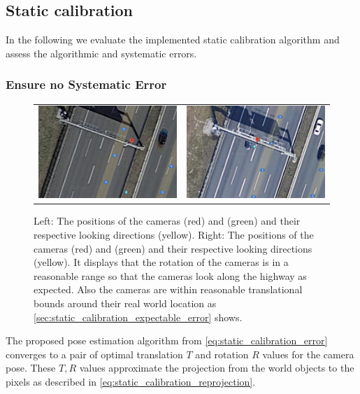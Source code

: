 
\subsection{Static calibration}
In the following we evaluate the implemented static calibration algorithm and assess the algorithmic and systematic errors.

\subsubsection{Ensure no Systematic Error}

\begin{figure}[t]
    \centering
    \begin{tabular}{cc}
      \includegraphics[width=0.45 \linewidth]{images/calibration/google_maps_s50_s.png} &
      \includegraphics[width=0.45 \linewidth]{images/calibration/google_maps_s40_n.png} 
  \end{tabular}
  \caption{Left: The positions of the cameras  (red) and  (green) and their respective looking directions (yellow). 
  Right: The positions of the cameras  (red) and  (green) and their respective looking directions (yellow). 
  It displays that the rotation of the cameras is in a reasonable range so that the cameras look along the highway as expected. 
  Also the cameras are within reasonable translational bounds around their real world location as \autoref{sec:static_calibration_expectable_error} shows.
  }
  \label{fig:google_maps}
  \end{figure}

The proposed pose estimation algorithm from \autoref{eq:static_calibration_error} converges to a pair of optimal translation $T$ and rotation $R$ values for the camera pose.
These $T, R$ values approximate the projection from the world objects to the pixels as described in \autoref{eq:static_calibration_reprojection}.

